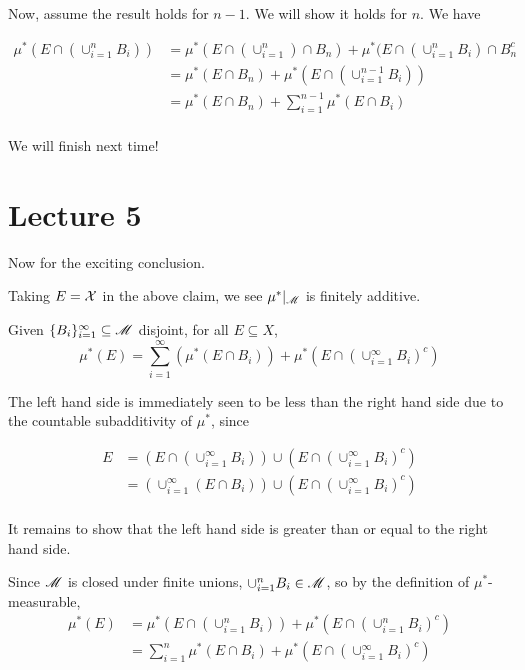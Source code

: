 \documentclass[x11names,reqno,14pt]{extarticle}
\newcommand*{\oo}{\infty}
\newcommand{\seq}[1]{_{#1 = 1}^\oo}
\begin{document}
Now, assume the result holds for $n - 1$. We will show it holds for $n$. We have

\begin{align*}
\mu^*(E\cap(\cup_{i=1}^n B_i)) & = \mu^*(E\cap(\cup_{i=1}^{n})\cap B_n) + \mu^*(E \cap (\cup_{i=1}^{n}B_i) \cap B_n^c \\
										  & = \mu^*(E\cap B_n) + \mu^*(E\cap(\cup_{i=1}^{n - 1}B_i)) \\
										  & = \mu^*(E\cap B_n) + \sum_{i=1}^{n - 1}\mu^*(E\cap B_i) \\
\end{align*}

We will finish next time!

\section*{Lecture 5}

Now for the exciting conclusion. 

Taking $E = \mathcal{X}$ in the above claim, we see $\mu^*|_{\mathscr{M}}$ is finitely additive. 

\claim

Given $\{B_i\}\seq{i}\subseteq \ms{M}$ disjoint, for all $E\subseteq X$, 
\[
\mu^*(E)= \sum\seq{i}(\mu^*(E\cap B_i)) + \mu^*(E\cap(\cup\seq{i}B_i)^c)
\]

\proof

The left hand side is immediately seen to be less than the right hand side due to the countable subadditivity of $\mu^*$, since 

\begin{align*}
E & = (E\cap(\cup\seq{i}B_i))\cup(E\cap(\cup\seq{i}B_i)^c) \\
  & = (\cup\seq{i}(E\cap B_i))\cup(E\cap(\cup\seq{i}B_i)^c) \\
\end{align*}

It remains to show that the left hand side is greater than or equal to the right hand side. 

Since $\mathscr{M}$ is closed under finite unions, $\cup_{i=1}^nB_i \in \mathscr{M}$, so by the definition of $\mu^*$-measurable, 
\begin{align*}
\mu^*(E) & = \mu^*(E\cap(\cup_{i=1}^nB_i)) + \mu^*(E\cap(\cup_{i=1}^nB_i)^c)\\
			& = \sum_{i=1}^n\mu^*(E\cap B_i) + \mu^*(E\cap(\cup\seq{i}B_i)^c)\\
\end{align*}
\end{document}
